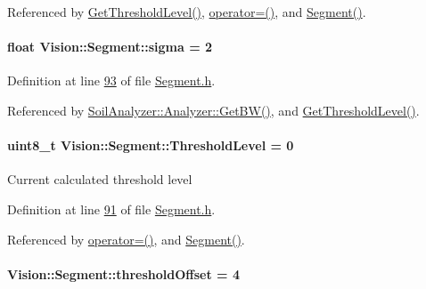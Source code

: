 Referenced by \hyperlink{_segment_8cpp_source_l00069}{Get\+Threshold\+Level()}, \hyperlink{_segment_8cpp_source_l00041}{operator=()}, and \hyperlink{_segment_8cpp_source_l00026}{Segment()}.

\hypertarget{class_vision_1_1_segment_a0d2c607a6064d8d8fea925fc7bfbbc53}{}
\paragraph[{sigma}]{\setlength{\rightskip}{0pt plus 5cm}float Vision\+::\+Segment\+::sigma = 2}\label{class_vision_1_1_segment_a0d2c607a6064d8d8fea925fc7bfbbc53}


Definition at line \hyperlink{_segment_8h_source_l00093}{93} of file \hyperlink{_segment_8h_source}{Segment.\+h}.



Referenced by \hyperlink{analyzer_8cpp_source_l00236}{Soil\+Analyzer\+::\+Analyzer\+::\+Get\+B\+W()}, and \hyperlink{_segment_8cpp_source_l00069}{Get\+Threshold\+Level()}.

\hypertarget{class_vision_1_1_segment_a44f45a7d08ba6fed38e5c31bc9108291}{}
\paragraph[{Threshold\+Level}]{\setlength{\rightskip}{0pt plus 5cm}uint8\+\_\+t Vision\+::\+Segment\+::\+Threshold\+Level = 0}\label{class_vision_1_1_segment_a44f45a7d08ba6fed38e5c31bc9108291}
Current calculated threshold level 

Definition at line \hyperlink{_segment_8h_source_l00091}{91} of file \hyperlink{_segment_8h_source}{Segment.\+h}.



Referenced by \hyperlink{_segment_8cpp_source_l00041}{operator=()}, and \hyperlink{_segment_8cpp_source_l00026}{Segment()}.

\hypertarget{class_vision_1_1_segment_a1338fc42ead26c6b1dd661f4281f5674}{}
\paragraph[{threshold\+Offset}]{ Vision\+::\+Segment\+::threshold\+Offset = 4}\label{class_vision_1_1_segment_a1338fc42ead26c6b1dd661f4281f5674}


